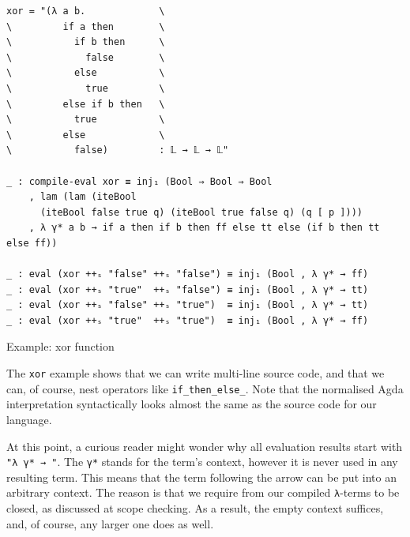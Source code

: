 \begin{listing}[H]
\begin{verbatim}
xor = "(λ a b.             \
\         if a then        \
\           if b then      \
\             false        \
\           else           \
\             true         \
\         else if b then   \
\           true           \
\         else             \
\           false)         : 𝕃 → 𝕃 → 𝕃"

_ : compile-eval xor ≡ inj₁ (Bool ⇒ Bool ⇒ Bool
    , lam (lam (iteBool
      (iteBool false true q) (iteBool true false q) (q [ p ])))
    , λ γ* a b → if a then if b then ff else tt else (if b then tt else ff))

_ : eval (xor ++ₛ "false" ++ₛ "false") ≡ inj₁ (Bool , λ γ* → ff)
_ : eval (xor ++ₛ "true"  ++ₛ "false") ≡ inj₁ (Bool , λ γ* → tt)
_ : eval (xor ++ₛ "false" ++ₛ "true")  ≡ inj₁ (Bool , λ γ* → tt)
_ : eval (xor ++ₛ "true"  ++ₛ "true")  ≡ inj₁ (Bool , λ γ* → ff)
\end{verbatim}
\caption{Example: xor function}
\label{code:examples-xor}
\end{listing}

The \verb$xor$ example shows that we can write multi-line source code, and that we can, of course, nest operators like \verb$if_then_else_$. Note that the normalised Agda interpretation syntactically looks almost the same as the source code for our language.

At this point, a curious reader might wonder why all evaluation results start with \verb$"λ γ* → "$. The \verb$γ*$ stands for the term's context, however it is never used in any resulting term. This means that the term following the arrow can be put into an arbitrary context. The reason is that we require from our compiled \verb$λ$-terms to be closed, as discussed at scope checking. As a result, the empty context suffices, and, of course, any larger one does as well.

